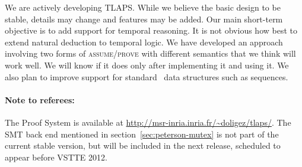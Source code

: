 \documentclass[a4paper]{llncs}
\begin{document}

We are actively developing TLAPS. While we believe the basic design to
be stable, details may change and features may be added.  Our main
short-term objective is to add support for temporal reasoning.  It is
not obvious how best to extend natural deduction to temporal logic.
We have developed an approach involving two forms of
\textsc{assume}/\textsc{prove} with different semantics that we think
will work well.  We will know if it does only after implementing it
and using it.  We also plan to improve support for standard \tlaplus\
data structures such as sequences.  


\paragraph{Note to referees:} The \tlaplus Proof System is available at
\url{http://msr-inria.inria.fr/~doligez/tlaps/}. The SMT back end mentioned in
section~\ref{sec:peterson-mutex} is not part of the current stable version, but
will be included in the next release, scheduled to appear before VSTTE 2012.


\end{document}
